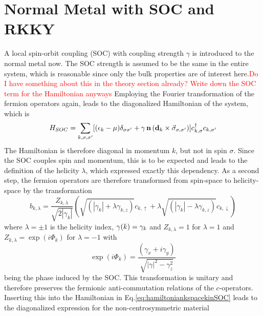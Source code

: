 \section{Normal Metal with SOC and RKKY}\label{sec:RKKY_SOC}

A local spin-orbit coupling (SOC) with coupling strength $\gamma$ is introduced to the normal metal now.
The SOC strength is assumed to be the same in the entire system, which is reasonable since only the bulk properties are of interest here.\textcolor{red}{Do I have something about this in the theory section already? Write down the SOC term for the Hamiltonian anyways}
Employing the Fourier transformation of the fermion operators again, leads to the diagonalized Hamiltonian of the system, which is
\begin{align}
    H_{SOC} = \sum_{k,\sigma, \sigma'} [(\epsilon_k - \mu)\delta_{\sigma \sigma'} + \vb{\gamma}\, \vb{n} \left(\vb{d}_{k} \times \Vec{\sigma}_{\sigma, \sigma'} \right) ] c^{\dag}_{k,\sigma}c_{k,\sigma'}
\end{align}
The Hamiltonian is therefore diagonal in momentum $k$, but not in spin $\sigma$. 
Since the SOC couples spin and momentum, this is to be expected and leads to the definition of the helicity $\lambda$, which expressed exactly this dependency.
As a second step, the fermion operators are therefore transformed from spin-space to helicity-space \cite{samokhin2008gap, mukherjee_soumya_p_superconductivity_2014} by the transformation
\begin{equation}\label{eq:helicitytrafo}
    b_{k,\lambda} = \frac{Z_{k,\lambda}}{\sqrt{2|\gamma_k|}}\left(\sqrt{(|\gamma_k|+\lambda \gamma_{k,z})}c_{k, \uparrow} + \lambda \sqrt{(|\gamma_k|-\lambda \gamma_{k,z})}c_{k,\downarrow}\right)
\end{equation}
where $\lambda= \pm 1$ is the helicity index, $\vb{\gamma}(k) = \gamma_k$ and $Z_{k, \lambda} = 1$ for $\lambda=1$ and $Z_{k, \lambda} = \exp(i\Phi_k)$ for $\lambda=-1$ with
\begin{equation}\label{eq:helicitytrafo_phase}
    \exp(i\Phi_k)=\frac{(\gamma_x + i \gamma_y)}{\sqrt{|\gamma|^2 - \gamma_z^2}}
\end{equation}
being the phase induced by the SOC.
This transformation is unitary and therefore preserves the fermionic anti-commutation relations of the $c$-operators.\newline
Inserting this into the Hamiltonian in Eq.\eqref{eq:hamiltoniankspacekinSOC} leads to the diagonalized expression for the non-centrosymmetric material
